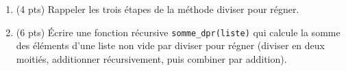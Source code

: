 \begin{enumerate}
  \item (4 pts) Rappeler les trois étapes de la méthode diviser pour régner.
  \item (6 pts) Écrire une fonction récursive \lstinline{somme_dpr(liste)} qui calcule la somme des éléments d'une liste non vide par diviser pour régner (diviser en deux moitiés, additionner récursivement, puis combiner par addition).
\end{enumerate}

